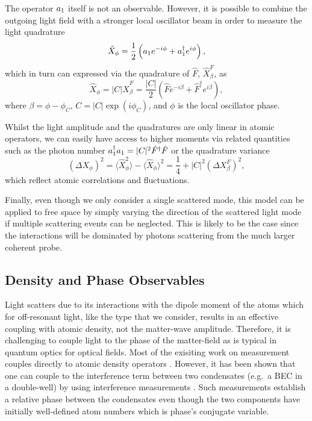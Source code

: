The operator $a_1$ itself is not an observable. However, it is
possible to combine the outgoing light field with a stronger local
oscillator beam in order to measure the light quadrature
\begin{equation}
  \hat{X}_\phi = \frac{1}{2} \left( a_1 e^{-i \phi} + a^\dagger_1 e^{i \phi} \right),
\end{equation}
which in turn can expressed via the quadrature of $\hat{F}$,
$\hat{X}^F_\beta$, as
\begin{equation}
  \hat{X}_\phi = |C| \hat{X}_\beta^F = \frac{|C|}{2} \left( \hat{F}
    e^{-i \beta} + \hat{F}^\dagger e^{i \beta} \right),
\end{equation}
where $\beta = \phi - \phi_C$, $C = |C| \exp(i \phi_C)$, and $\phi$ is
the local oscillator phase.

Whilst the light amplitude and the quadratures are only linear in
atomic operators, we can easily have access to higher moments via
related quantities such as the photon number
$a^\dagger_1 a_1 = |C|^2 \hat{F}^\dagger \hat{F}$ or the quadrature
variance
\begin{equation}
  \label{eq:Xvar}
  ( \Delta X_\phi )^2 = \langle \hat{X}_\phi^2 \rangle - \langle
  \hat{X}_\phi \rangle^2 = \frac{1}{4} + |C|^2 (\Delta X^F_\beta)^2,
\end{equation}
which reflect atomic correlations and fluctuations.

Finally, even though we only consider a single scattered mode, this
model can be applied to free space by simply varying the direction of
the scattered light mode if multiple scattering events can be
neglected. This is likely to be the case since the interactions will
be dominated by photons scattering from the much larger coherent
probe.

\subsection{Density and Phase Observables}
\label{sec:B}

Light scatters due to its interactions with the dipole moment of the
atoms which for off-resonant light, like the type that we consider,
results in an effective coupling with atomic density, not the
matter-wave amplitude. Therefore, it is challenging to couple light to
the phase of the matter-field as is typical in quantum optics for
optical fields. Most of the exisiting work on measurement couples
directly to atomic density operators \cite{mekhov2012, LP2009,
  rogers2014, ashida2015, ashida2015a}. However, it has been shown
that one can couple to the interference term between two condensates
(e.g.~a BEC in a double-well) by using interference measurements
\cite{cirac1996, castin1997, ruostekoski1997, ruostekoski1998,
  rist2012}. Such measurements establish a relative phase between the
condensates even though the two components have initially well-defined
atom numbers which is phase's conjugate variable.

